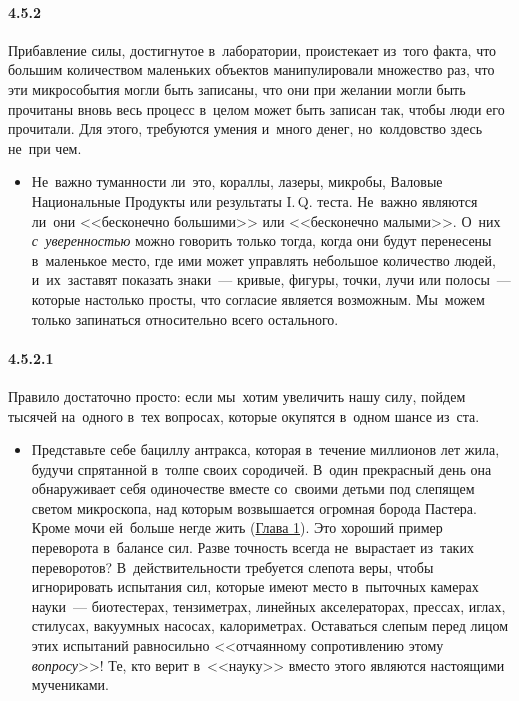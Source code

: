 \paragraph{4.5.2}\hypertarget{par:4.5.2}{} Прибавление силы, достигнутое в~лаборатории, проистекает из~того факта, что большим количеством маленьких объектов манипулировали множество раз, что эти микрособытия могли быть записаны, что они при желании могли быть прочитаны вновь весь процесс в~целом может быть записан так, чтобы люди его прочитали. Для этого, требуются умения и~много денег, но~колдовство здесь не~при чем. 
	\begin{itemize}
	\item 
 Не~важно туманности ли~это, кораллы, лазеры, микробы, Валовые Национальные Продукты или результаты I.\,Q. теста. Не~важно являются ли~они <<бесконечно большими>> или <<бесконечно малыми>>. О~них {\itshape с~уверенностью} можно говорить только тогда, когда они будут перенесены в~маленькое место, где ими может управлять небольшое количество людей, и~их~заставят показать знаки~--- кривые, фигуры, точки, лучи или полосы~--- которые настолько просты, что согласие является возможным. Мы~можем только запинаться относительно всего остального.
	\end{itemize}	

\paragraph{4.5.2.1}\hypertarget{par:4.5.2.1}{} Правило достаточно просто: если мы~хотим увеличить нашу силу, пойдем тысячей на~одного в~тех вопросах, которые окупятся в~одном шансе из~ста. 
	\begin{itemize}
	\item 
	Представьте себе бациллу антракса, которая в~течение миллионов лет жила, будучи спрятанной в~толпе своих сородичей. В~один прекрасный день она обнаруживает себя одиночестве вместе со~своими детьми под слепящем светом микроскопа, над которым возвышается огромная борода Пастера. Кроме мочи ей~больше негде жить (\hyperlink{chap1}{Глава 1}). Это хороший пример переворота в~балансе сил. Разве точность всегда не~вырастает из~таких переворотов? В~действительности требуется слепота веры, чтобы игнорировать испытания сил, которые имеют место в~пыточных камерах науки~--- биотестерах, тензиметрах, линейных акселераторах, прессах, иглах, стилусах, вакуумных насосах, калориметрах. Оставаться слепым перед лицом этих испытаний равносильно <<отчаянному сопротивлению этому {\itshape вопросу}>>! Те, кто верит в~<<науку>> вместо этого являются настоящими мучениками.
	\end{itemize}	

